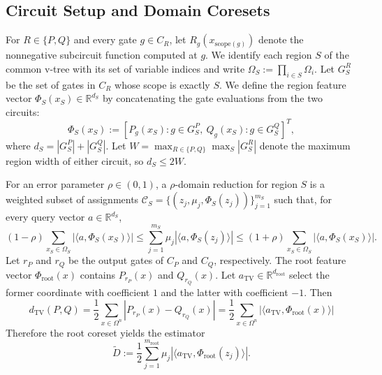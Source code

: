\documentclass{article}
\begin{document}
\subsection{Circuit Setup and Domain Coresets}
For $R\in\{P,Q\}$ and every gate $g\in C_R$, let $R_g(x_{\mathrm{scope}(g)})$ denote the nonnegative subcircuit function computed at $g$. We identify each region $S$ of the common v-tree with its set of variable indices and write $\Omega_S:=\prod_{i\in S}\Omega_i$. Let $G_S^R$ be the set of gates in $C_R$ whose scope is exactly $S$. We define the region feature vector $\Phi_S(x_S) \in \mathbb{R}^{d_S}$ by concatenating the gate evaluations from the two circuits:
\begin{equation*}
    \Phi_S(x_S) := \left[ P_g(x_S) : g \in G_S^P, \ Q_g(x_S) : g \in G_S^Q \right]^T,
\end{equation*}
where $d_S = |G_S^P|+|G_S^Q|$. Let $W = \max_{R\in\{P,Q\}}\max_S |G_S^R|$ denote the maximum region width of either circuit, so $d_S\leq 2W$.

For an error parameter $\rho\in(0,1)$, a $\rho$-domain reduction for region $S$ is a weighted subset of assignments $\mathcal{C}_S = \{(z_j, \mu_j, \Phi_S(z_j))\}_{j=1}^{m_S}$ such that, for every query vector $a \in \mathbb{R}^{d_S}$,
\begin{equation*}
    (1-\rho)\sum_{x_S \in \Omega_S} \left| \langle a, \Phi_S(x_S) \rangle \right|
    \leq \sum_{j=1}^{m_S} \mu_j \left| \langle a, \Phi_S(z_j) \rangle \right|
    \leq (1+\rho)\sum_{x_S \in \Omega_S} \left| \langle a, \Phi_S(x_S) \rangle \right|.
\end{equation*}
Let $r_P$ and $r_Q$ be the output gates of $C_P$ and $C_Q$, respectively. The root feature vector $\Phi_{\mathrm{root}}(x)$ contains $P_{r_P}(x)$ and $Q_{r_Q}(x)$. Let $a_{\mathrm{TV}} \in \mathbb{R}^{d_{\mathrm{root}}}$ select the former coordinate with coefficient $1$ and the latter with coefficient $-1$. Then
\begin{equation*}
    d_{\mathrm{TV}}(P, Q) = \frac{1}{2} \sum_{x \in \Omega^n} |P_{r_P}(x) - Q_{r_Q}(x)| = \frac{1}{2} \sum_{x \in \Omega^n} \left| \langle a_{\mathrm{TV}}, \Phi_{\mathrm{root}}(x) \rangle \right|
\end{equation*}
Therefore the root coreset yields the estimator
\begin{equation*}
     \widetilde D:=\frac{1}{2} \sum_{j=1}^{m_{\mathrm{root}}} \mu_j \left| \langle a_{\mathrm{TV}}, \Phi_{\mathrm{root}}(z_j) \rangle \right|.
\end{equation*}
\end{document}
